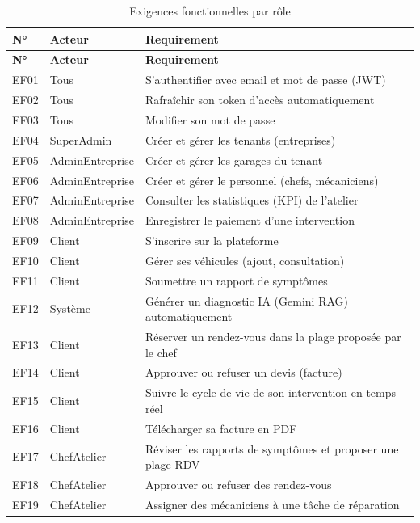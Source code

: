 \documentclass[12pt,a4paper]{report}
\begin{document}
\begin{longtable}{|p{0.5cm}|p{2.5cm}|p{8cm}|}
\caption{Exigences fonctionnelles par rôle}\label{tab:exigences}\\
\hline
\rowcolor{indigolite!60}
\textbf{N°} & \textbf{Acteur} & \textbf{Requirement} \\
\hline
\endfirsthead
\hline
\rowcolor{indigolite!60}
\textbf{N°} & \textbf{Acteur} & \textbf{Requirement} \\
\hline
\endhead
\hline
\endlastfoot
EF01 & Tous & S'authentifier avec email et mot de passe (JWT) \\
\hline
EF02 & Tous & Rafraîchir son token d'accès automatiquement \\
\hline
EF03 & Tous & Modifier son mot de passe \\
\hline
EF04 & SuperAdmin & Créer et gérer les tenants (entreprises) \\
\hline
EF05 & AdminEntreprise & Créer et gérer les garages du tenant \\
\hline
EF06 & AdminEntreprise & Créer et gérer le personnel (chefs, mécaniciens) \\
\hline
EF07 & AdminEntreprise & Consulter les statistiques (KPI) de l'atelier \\
\hline
EF08 & AdminEntreprise & Enregistrer le paiement d'une intervention \\
\hline
EF09 & Client & S'inscrire sur la plateforme \\
\hline
EF10 & Client & Gérer ses véhicules (ajout, consultation) \\
\hline
EF11 & Client & Soumettre un rapport de symptômes \\
\hline
EF12 & Système & Générer un diagnostic IA (Gemini RAG) automatiquement \\
\hline
EF13 & Client & Réserver un rendez-vous dans la plage proposée par le chef \\
\hline
EF14 & Client & Approuver ou refuser un devis (facture) \\
\hline
EF15 & Client & Suivre le cycle de vie de son intervention en temps réel \\
\hline
EF16 & Client & Télécharger sa facture en PDF \\
\hline
EF17 & ChefAtelier & Réviser les rapports de symptômes et proposer une plage RDV \\
\hline
EF18 & ChefAtelier & Approuver ou refuser des rendez-vous \\
\hline
EF19 & ChefAtelier & Assigner des mécaniciens à une tâche de réparation \\

\end{longtable}
\end{document}
